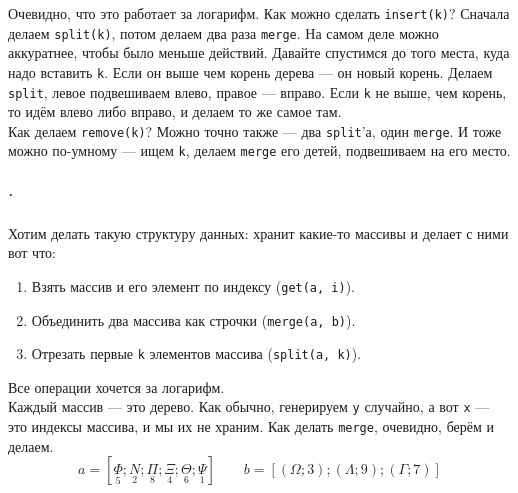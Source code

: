\documentclass{article}
\newcommand{\pseudo}{PseudoLexer.py:PseudoLexer -x}
\newcommand{\pseudocode}[1]{\texttt{#1}}
\begin{document}
    Очевидно, что это работает за логарифм. Как можно сделать \pseudocode{insert(k)}? Сначала делаем \pseudocode{split(k)}, потом делаем два раза \pseudocode{merge}. На самом деле можно аккуратнее, чтобы было меньше действий. Давайте спустимся до того места, куда надо вставить \pseudocode{k}. Если он выше чем корень дерева --- он новый корень. Делаем \pseudocode{split}, левое подвешиваем влево, правое --- вправо. Если \pseudocode{k} не выше, чем корень, то идём влево либо вправо, и делаем то же самое там.\\
    Как делаем \pseudocode{remove(k)}? Можно точно также --- два \pseudocode{split}'а, один \pseudocode{merge}. И тоже можно по-умному --- ищем \pseudocode{k}, делаем \pseudocode{merge} его детей, подвешиваем на его место.
    \subparagraph{.}
    Хотим делать такую структуру данных: хранит какие-то массивы и делает с ними вот что:
    \begin{enumerate}
        \item Взять массив и его элемент по индексу (\pseudocode{get(a, i)}).
        \item Объединить два массива как строчки (\pseudocode{merge(a, b)}).
        \item Отрезать первые \pseudocode{k} элементов массива (\pseudocode{split(a, k)}).
    \end{enumerate}
    Все операции хочется за логарифм.\\
    Каждый массив --- это дерево. Как обычно, генерируем \pseudocode{y} случайно, а вот \pseudocode{x} --- это индексы массива, и мы их не храним. Как делать \pseudocode{merge}, очевидно, берём и делаем.\\
    $$a=[\underset5\Phi;\underset2N;\underset8\Pi;\underset4\Xi;\underset6\Theta;\underset1\Psi]\qquad b=[(\Omega;3);(\Lambda;9);(\Gamma;7)]$$
\end{document}
